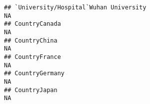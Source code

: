 \documentclass[]{article}
\begin{document}
\begin{verbatim}
## `University/Hospital`Wuhan University                                                                                                                                                                                                                                                                                                                                                                                                                                                NA
## CountryCanada                                                                                                                                                                                                                                                                                                                                                                                                                                                                        NA
## CountryChina                                                                                                                                                                                                                                                                                                                                                                                                                                                                         NA
## CountryFrance                                                                                                                                                                                                                                                                                                                                                                                                                                                                        NA
## CountryGermany                                                                                                                                                                                                                                                                                                                                                                                                                                                                       NA
## CountryJapan                                                                                                                                                                                                                                                                                                                                                                                                                                                                         NA

\end{verbatim}
\end{document}

